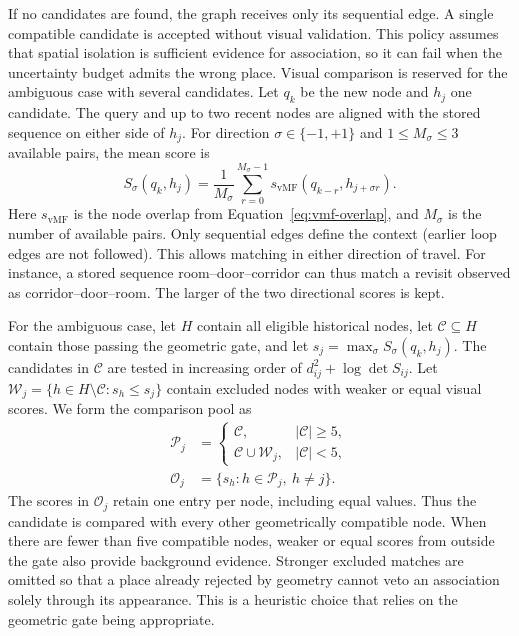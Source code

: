 \documentclass[5p,twocolumn,nonatbib,reversenotenum]{elsarticle}
\begin{document}
If no candidates are found, the graph receives only its sequential edge. A single compatible candidate is accepted without visual validation. This policy assumes that spatial isolation is sufficient evidence for association, so it can fail when the uncertainty budget admits the wrong place. Visual comparison is reserved for the ambiguous case with several candidates. Let $q_k$ be the new node and $h_j$ one candidate. The query and up to two recent nodes are aligned with the stored sequence on either side of $h_j$. For direction $\sigma\in\{-1,+1\}$ and $1\leq M_{\sigma}\leq3$ available pairs, the mean score is
\begin{equation}
    S_{\sigma}(q_k,h_j)=\frac{1}{M_{\sigma}}
    \sum_{r=0}^{M_{\sigma}-1}
    s_{\mathrm{vMF}}(q_{k-r},h_{j+\sigma r}).
\end{equation}
Here $s_{\mathrm{vMF}}$ is the node overlap from Equation~\ref{eq:vmf-overlap}, and $M_{\sigma}$ is the number of available pairs. Only sequential edges define the context (earlier loop edges are not followed). This allows matching in either direction of travel. For instance, a stored sequence room--door--corridor can thus match a revisit observed as corridor--door--room. The larger of the two directional scores is kept.

For the ambiguous case, let $H$ contain all eligible historical nodes, let $\mathcal{C}\subseteq H$ contain those passing the geometric gate, and let $s_j=\max_{\sigma}S_{\sigma}(q_k,h_j)$. The candidates in $\mathcal{C}$ are tested in increasing order of $d^2_{ij}+\log\det S_{ij}$. Let $\mathcal{W}_j=\{h\in H\setminus\mathcal{C}:s_h\leq s_j\}$ contain excluded nodes with weaker or equal visual scores. We form the comparison pool as
\begin{equation}
\begin{aligned}
    \mathcal{P}_j &=
    \begin{cases}
        \mathcal{C}, & |\mathcal{C}|\geq5,\\
        \mathcal{C}\cup\mathcal{W}_j, & |\mathcal{C}|<5,
    \end{cases}\\
    \mathcal{O}_j &= \{s_h:h\in\mathcal{P}_j,\ h\neq j\}.
\end{aligned}
\end{equation}
The scores in $\mathcal{O}_j$ retain one entry per node, including equal values. Thus the candidate is compared with every other geometrically compatible node. When there are fewer than five compatible nodes, weaker or equal scores from outside the gate also provide background evidence. Stronger excluded matches are omitted so that a place already rejected by geometry cannot veto an association solely through its appearance. This is a heuristic choice that relies on the geometric gate being appropriate.
\end{document}
